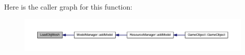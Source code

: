 Here is the caller graph for this function\+:\nopagebreak
\begin{figure}[H]
\begin{center}
\leavevmode
\includegraphics[width=350pt]{d4/d6c/_obj_loader_8h_aa84c4e033f99ef54ac11d3ac558c2f9c_icgraph}
\end{center}
\end{figure}


